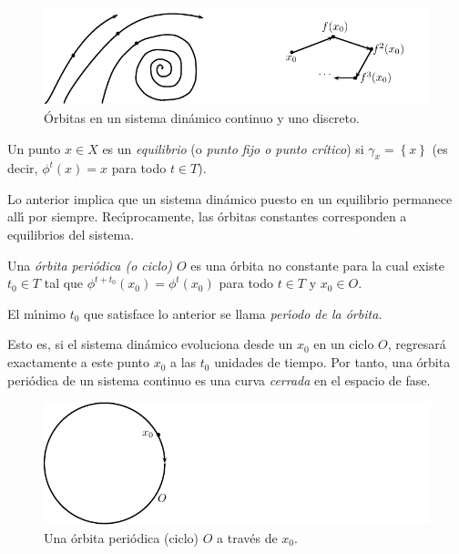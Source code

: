 \begin{figure}[ht] \centering
    \includegraphics[scale=1.3]{figures/orbits-continuousanddiscrete.pdf}
    \caption{Órbitas en un sistema dinámico continuo y uno discreto.}
	\label{fig:orbits}
\end{figure}

\begin{definition}
  \label{def:equilibrium}Un punto $x \in X$ es un {\emph{equilibrio}} (o
  {\emph{punto fijo o punto crítico}}) si $\gamma_x = \left\{ x \right\}$ (es decir,
  $\phi^t \left( x \right) = x$ para todo $t \in T$).
\end{definition}

Lo anterior implica que un sistema din\'amico puesto en un equilibrio permanece all\'{\i} por siempre. Rec\'{\i}procamente, las \'orbitas constantes corresponden a equilibrios del sistema.

\begin{definition}
  \label{def:periodicorbit}Una {\emph{\'orbita peri\'odica (o ciclo) $O$}}
  es una \'orbita no constante para la cual existe $t_0 \in T$ tal que
  $\phi^{t + t_0} \left( x_0 \right) = \phi^t \left( x_0 \right)$ para todo $t
  \in T$ y $x_0 \in O$.
  
  El m\'{\i}nimo $t_0$ que satisface lo anterior se llama
  {\emph{per\'{\i}odo de la \'orbita.}}
\end{definition}

Esto es, si el sistema din\'amico evoluciona desde un $x_0$ en un ciclo $O$,
regresar\'a exactamente a este punto $x_0$ a las $t_0$ unidades de tiempo. Por
tanto, una \'orbita peri\'odica de un sistema continuo es una curva
{\emph{cerrada}} en el espacio de fase.

\begin{figure}[!hb] \centering
    \includegraphics[scale=1.3]{figures/orbit-cycle.pdf}
    \caption{Una órbita periódica (ciclo) $O$ a través de $x_0$.}
	\label{fig:cycle}
\end{figure}

